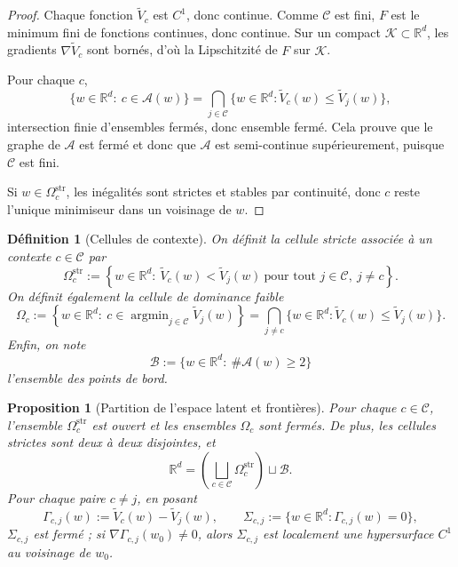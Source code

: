 \documentclass[11pt,a4paper]{article}
\newtheorem{definition}{Définition}[section]
\newtheorem{proposition}{Proposition}[section]
\DeclareMathOperator{\argmin}{argmin}
\newcommand{\R}{\mathbb R}
\newcommand{\Ccal}{\mathcal C}
\newcommand{\Acal}{\mathcal A}
\newcommand{\Bcal}{\mathcal B}
\begin{document}
\begin{proof}
Chaque fonction \(\widetilde V_c\) est \(C^1\), donc continue. Comme \(\Ccal\) est fini, \(F\) est le minimum fini de fonctions continues, donc continue. Sur un compact \(\mathcal K\subset\R^d\), les gradients \(\nabla\widetilde V_c\) sont bornés, d'où la Lipschitzité de \(F\) sur \(\mathcal K\).

Pour chaque \(c\),
\[
\{w\in\R^d:\ c\in\Acal(w)\}
=
\bigcap_{j\in\Ccal}\{w\in\R^d:\widetilde V_c(w)\le \widetilde V_j(w)\},
\]
intersection finie d'ensembles fermés, donc ensemble fermé. Cela prouve que le graphe de \(\Acal\) est fermé et donc que \(\Acal\) est semi-continue supérieurement, puisque \(\Ccal\) est fini.

Si \(w\in\Omega_c^{\mathrm{str}}\), les inégalités sont strictes et stables par continuité, donc \(c\) reste l'unique minimiseur dans un voisinage de \(w\).
\end{proof}

\begin{definition}[Cellules de contexte]
On définit la cellule stricte associée à un contexte \(c\in\Ccal\) par
\[
\Omega_c^{\mathrm{str}}
:=
\left\{
w\in\R^d:\ \widetilde V_c(w)<\widetilde V_j(w)\ \text{pour tout }j\in\Ccal,\ j\neq c
\right\}.
\]
On définit également la cellule de dominance faible
\[
\Omega_c
:=
\left\{
w\in\R^d:\ c\in\argmin_{j\in\Ccal}\widetilde V_j(w)
\right\}
=
\bigcap_{j\neq c}\{w\in\R^d:\widetilde V_c(w)\le \widetilde V_j(w)\}.
\]
Enfin, on note
\[
\Bcal:=\{w\in\R^d:\ \#\Acal(w)\ge 2\}
\]
l'ensemble des points de bord.
\end{definition}

\begin{proposition}[Partition de l'espace latent et frontières]
Pour chaque \(c\in\Ccal\), l'ensemble \(\Omega_c^{\mathrm{str}}\) est ouvert et les ensembles \(\Omega_c\) sont fermés. De plus, les cellules strictes sont deux à deux disjointes, et
\[
\R^d
=
\left(\bigsqcup_{c\in\Ccal}\Omega_c^{\mathrm{str}}\right)\sqcup \Bcal.
\]
Pour chaque paire \(c\neq j\), en posant
\[
\Gamma_{c,j}(w):=\widetilde V_c(w)-\widetilde V_j(w),
\qquad
\Sigma_{c,j}:=\{w\in\R^d:\Gamma_{c,j}(w)=0\},
\]
\(\Sigma_{c,j}\) est fermé ; si \(\nabla\Gamma_{c,j}(w_0)\neq 0\), alors \(\Sigma_{c,j}\) est localement une hypersurface \(C^1\) au voisinage de \(w_0\).
\end{proposition}
\end{document}
